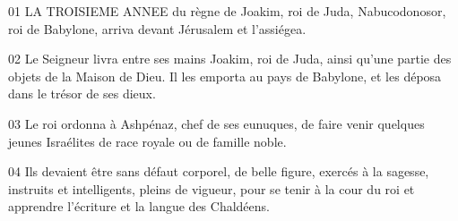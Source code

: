 01 LA TROISIEME ANNEE du règne de Joakim, roi de Juda, Nabucodonosor, roi de Babylone, arriva devant Jérusalem et l’assiégea.

02 Le Seigneur livra entre ses mains Joakim, roi de Juda, ainsi qu’une partie des objets de la Maison de Dieu. Il les emporta au pays de Babylone, et les déposa dans le trésor de ses dieux.

03 Le roi ordonna à Ashpénaz, chef de ses eunuques, de faire venir quelques jeunes Israélites de race royale ou de famille noble.

04 Ils devaient être sans défaut corporel, de belle figure, exercés à la sagesse, instruits et intelligents, pleins de vigueur, pour se tenir à la cour du roi et apprendre l’écriture et la langue des Chaldéens.
